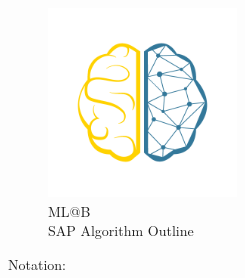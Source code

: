 \documentclass[11pt]{exam}
\theoremstyle{quest}
\begin{document}
\begin{figure}[t]
    \centering
    \includegraphics[width=5cm]{brain}\\
    \Large ML@B\\
    SAP Algorithm Outline
\end{figure}
\vspace{}
Notation:
\end{document}
